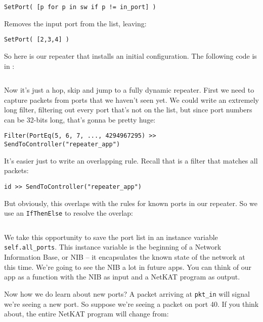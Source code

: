 \begin{verbatim}
SetPort( [p for p in sw if p != in_port] )
\end{verbatim}

Removes the input port from the list, leaving:

\begin{verbatim}
SetPort( [2,3,4] )
\end{verbatim}

So here is our repeater that installs an initial configuration.
The following code is in :

\inputminted{python}{code/netkat_principles/repeater4.py}

Now it's just a hop, skip and  jump to a fully dynamic repeater.  First we need to capture packets from ports
that we haven't seen yet.  We could write an extremely long filter, filtering out every port that's not on the
list, but since port numbers can be 32-bits long, that's gonna be pretty huge:

\begin{verbatim}
Filter(PortEq(5, 6, 7, ..., 4294967295) >> SendToController("repeater_app")
\end{verbatim}

It's easier just to write an overlapping rule.  Recall that  is a filter that matches all packets:

\begin{verbatim}
id >> SendToController("repeater_app")
\end{verbatim}

But obviously, this overlaps with the rules for known ports in our repeater.  So we use an \texttt{IfThenElse} to 
resolve the overlap:

\inputminted[firstline=14,lastline=25]{python}{code/netkat_principles/repeater5.py}

We take this opportunity to save the port list in an instance variable \texttt{self.all\_ports}.  This instance variable
is the beginning of a Network Information Base, or NIB -- it encapsulates the known state of the network
at this time.  We're going to see the NIB a lot in future apps.  You can think of our app as a function with the
NIB as input and a NetKAT program as output.  

Now how we do learn about new ports?  A packet arriving at \texttt{pkt\_in} will signal we're seeing a new port.
So suppose we're seeing a packet on port 40.  If you think about, the entire NetKAT program will change from:

